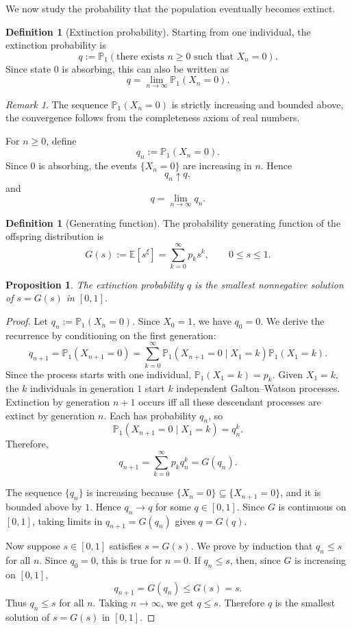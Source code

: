 \documentclass[11pt]{article}
\theoremstyle{plain}
\newtheorem{proposition}[theorem]{Proposition}
\theoremstyle{definition}
\newtheorem{definition}[theorem]{Definition}
\theoremstyle{remark}
\newtheorem{remark}[theorem]{Remark}
\begin{document}
	
	We now study the probability that the population eventually becomes extinct.
	
	\begin{definition}[Extinction probability]
		Starting from one individual, the extinction probability is
		\[
		q
		:=
		\mathbb{P}_1(\text{there exists }n\ge 0\text{ such that }X_n=0).
		\]
		Since state \(0\) is absorbing, this can also be written as
		\[
		q
		=
		\lim_{n\to\infty}\mathbb{P}_1(X_n=0).
		\]
	\end{definition}

    \begin{remark}
        The sequence $\mathbb{P_1}(X_n=0)$ is strictly increasing and bounded above,
        the convergence follows from the completeness axiom of real numbers.
    \end{remark}
	
	For \(n\ge 0\), define
	\[
	q_n:=\mathbb{P}_1(X_n=0).
	\]
	Since \(0\) is absorbing, the events \(\{X_n=0\}\) are increasing in \(n\). Hence
	\[
	q_n\uparrow q,
	\]
	and
	\[
	q=\lim_{n\to\infty}q_n.
	\]
	
	\begin{definition}[Generating function]
		The probability generating function of the offspring distribution is
		\[
		G(s)
		:=
		\mathbb{E}[s^{\xi}]
		=
		\sum_{k=0}^{\infty}p_ks^k,
		\qquad 0\le s\le 1.
		\]
	\end{definition}
	
\begin{proposition}
	The extinction probability \(q\) is the smallest nonnegative solution of \(s=G(s)\) in \([0,1]\).
\end{proposition}

\begin{proof}
	Let \(q_n:=\mathbb P_1(X_n=0)\). Since \(X_0=1\), we have \(q_0=0\). We derive the recurrence by conditioning on the first generation:
	\[
	q_{n+1}
	=\mathbb P_1(X_{n+1}=0)
	=\sum_{k=0}^{\infty}\mathbb P_1(X_{n+1}=0\mid X_1=k)\mathbb P_1(X_1=k).
	\]
	Since the process starts with one individual, \(\mathbb P_1(X_1=k)=p_k\). Given \(X_1=k\), the \(k\) individuals in generation \(1\) start \(k\) independent Galton--Watson processes. Extinction by generation \(n+1\) occurs iff all these descendant processes are extinct by generation \(n\). Each has probability \(q_n\), so
	\[
	\mathbb P_1(X_{n+1}=0\mid X_1=k)=q_n^k.
	\]
	Therefore,
	\[
	q_{n+1}=\sum_{k=0}^{\infty}p_kq_n^k=G(q_n).
	\]
	
	The sequence \(\{q_n\}\) is increasing because \(\{X_n=0\}\subseteq \{X_{n+1}=0\}\), and it is bounded above by \(1\). Hence \(q_n\to q\) for some \(q\in[0,1]\). Since \(G\) is continuous on \([0,1]\), taking limits in \(q_{n+1}=G(q_n)\) gives \(q=G(q)\).
	
	Now suppose \(s\in[0,1]\) satisfies \(s=G(s)\). We prove by induction that \(q_n\le s\) for all \(n\). Since \(q_0=0\), this is true for \(n=0\). If \(q_n\le s\), then, since \(G\) is increasing on \([0,1]\),
	\[
	q_{n+1}=G(q_n)\le G(s)=s.
	\]
	Thus \(q_n\le s\) for all \(n\). Taking \(n\to\infty\), we get \(q\le s\). Therefore \(q\) is the smallest solution of \(s=G(s)\) in \([0,1]\).
\end{proof}
\end{document}
